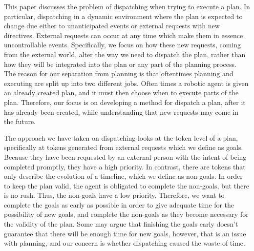 This paper discusses the problem of dispatching when trying to execute
a plan. In particular, dispatching in a dynamic environment where the
plan is expected to change due either to unanticipated events or external
requests with new directives. External requests  can occur
at any time which make them in essence uncontrollable events.
Specifically, we focus on how these new requests, coming from the
external world, alter the way we need to dispatch the plan, rather than
how they will be integrated into the plan or any part of the planning
process. The reason for our separation from planning is that
oftentimes planning and executing are split up into two different
jobs. Often times a robotic agent is given an already created plan, and it
must then choose when to execute parts of the plan. Therefore, our focus is on
developing a method for dispatch a plan, after it has already been created, while
understanding that new requests may come in the future.

The approach we have taken on dispatching looks at the token level of a plan,
specifically at tokens generated from external requests which we define as goals.
Because they have been requested by an external person with the intent of being 
completed promptly, they have a high priority. In contrast, there are tokens that only describe the
evolution of a timeline, which we define as non-goals. In order to keep the plan 
valid, the agent is obligated to complete the non-goals, but there is no rush. Thus, the
non-goals have a low priority. Therefore, we want to complete the goals
as early as possible in order to give adequate time for the possibility of new
goals, and complete the non-goals as they become necessary for the validity of the plan. 
Some may argue that finishing the goals early doesn't guarantee that
there will be enough time for new goals, however, that is an issue with planning, 
and our concern is whether dispatching caused the waste of time.


